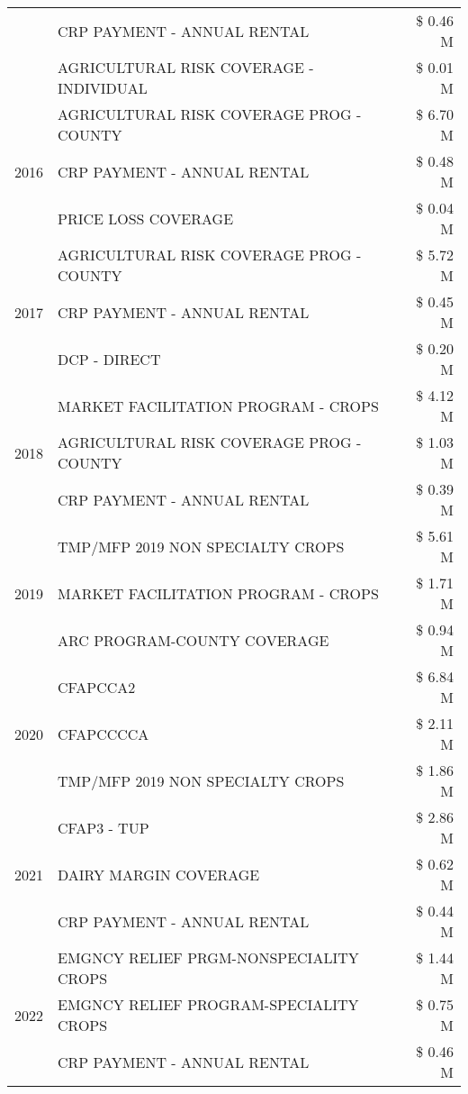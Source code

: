 \begin{tabular}{llr}
 & CRP PAYMENT - ANNUAL RENTAL & \$ 0.46 M \\
 & AGRICULTURAL RISK COVERAGE - INDIVIDUAL & \$ 0.01 M \\
\cline{1-3}
\multirow[t]{3}{*}{2016} & AGRICULTURAL RISK COVERAGE PROG - COUNTY & \$ 6.70 M \\
 & CRP PAYMENT - ANNUAL RENTAL & \$ 0.48 M \\
 & PRICE LOSS COVERAGE & \$ 0.04 M \\
\cline{1-3}
\multirow[t]{3}{*}{2017} & AGRICULTURAL RISK COVERAGE PROG - COUNTY & \$ 5.72 M \\
 & CRP PAYMENT - ANNUAL RENTAL & \$ 0.45 M \\
 & DCP - DIRECT & \$ 0.20 M \\
\cline{1-3}
\multirow[t]{3}{*}{2018} & MARKET FACILITATION PROGRAM - CROPS & \$ 4.12 M \\
 & AGRICULTURAL RISK COVERAGE PROG - COUNTY & \$ 1.03 M \\
 & CRP PAYMENT - ANNUAL RENTAL & \$ 0.39 M \\
\cline{1-3}
\multirow[t]{3}{*}{2019} & TMP/MFP 2019 NON SPECIALTY CROPS & \$ 5.61 M \\
 & MARKET FACILITATION PROGRAM - CROPS & \$ 1.71 M \\
 & ARC PROGRAM-COUNTY COVERAGE & \$ 0.94 M \\
\cline{1-3}
\multirow[t]{3}{*}{2020} & CFAPCCA2 & \$ 6.84 M \\
 & CFAPCCCCA & \$ 2.11 M \\
 & TMP/MFP 2019 NON SPECIALTY CROPS & \$ 1.86 M \\
\cline{1-3}
\multirow[t]{3}{*}{2021} & CFAP3 - TUP & \$ 2.86 M \\
 & DAIRY MARGIN COVERAGE & \$ 0.62 M \\
 & CRP PAYMENT - ANNUAL RENTAL & \$ 0.44 M \\
\cline{1-3}
\multirow[t]{3}{*}{2022} & EMGNCY RELIEF PRGM-NONSPECIALITY CROPS & \$ 1.44 M \\
 & EMGNCY RELIEF PROGRAM-SPECIALITY CROPS & \$ 0.75 M \\
 & CRP PAYMENT - ANNUAL RENTAL & \$ 0.46 M \\
\cline{1-3}
\bottomrule
\end{tabular}
